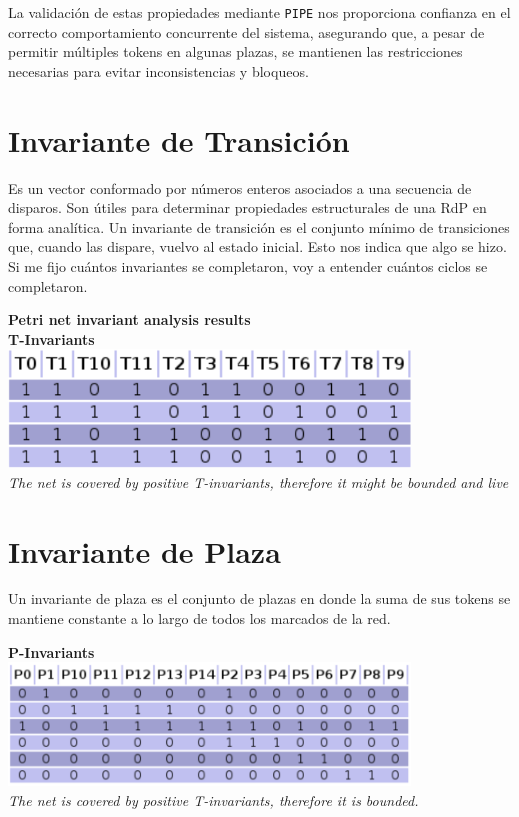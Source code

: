 \documentclass[12pt]{article}
\begin{document}
\bigskip

La validación de estas propiedades mediante \texttt{PIPE} nos proporciona confianza en el correcto comportamiento concurrente del sistema, asegurando que, a pesar de permitir múltiples tokens en algunas plazas, se mantienen las restricciones necesarias para evitar inconsistencias y bloqueos.
\newpage

\section{Invariante de Transición}
Es un vector conformado por números enteros asociados a una secuencia de disparos. Son útiles para determinar propiedades estructurales de una RdP en forma analítica. Un invariante de transición es el conjunto mínimo de transiciones que, cuando las dispare, vuelvo al estado inicial. Esto nos indica que algo se hizo. Si me fijo cuántos invariantes se completaron, voy a entender cuántos ciclos se completaron.

\begin{center}
    \textbf{Petri net invariant analysis results}\\
    \textbf{T-Invariants}\\
    \includegraphics[width=0.8\textwidth]{T-invariants.png}\\
    \textit{The net is covered by positive T-invariants, therefore it might be bounded and live}
\end{center}

\section{Invariante de Plaza}
Un invariante de plaza es el conjunto de plazas en donde la suma de sus tokens se mantiene constante a lo largo de todos los marcados de la red.

\begin{center}
    \textbf{P-Invariants}\\
    \includegraphics[width=0.8\textwidth]{P-invariants.png}\\
    \textit{The net is covered by positive T-invariants, therefore it is bounded.}
\end{center}
\end{document}
